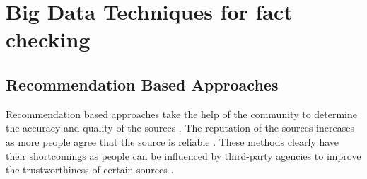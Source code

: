 \documentclass[sigconf]{acmart}
\begin{document}
\section{Big Data Techniques for fact checking}

\subsection{Recommendation Based Approaches}
Recommendation based approaches take the help of the community to determine the accuracy and quality of the sources \cite{Berti-Equille2016}. The reputation of the sources increases as more people agree that the source is reliable \cite{Berti-Equille2016}. These methods clearly have their shortcomings as people can be influenced by third-party agencies to improve the trustworthiness of certain sources \cite{Berti-Equille2016}.
\end{document}
